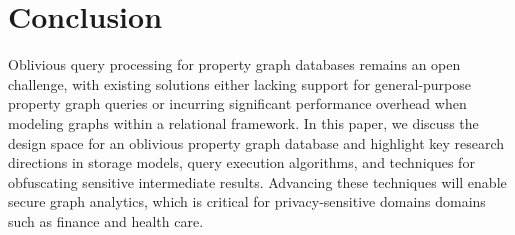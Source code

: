 \vspace{-0.7em}
\section{Conclusion}

Oblivious query processing for property graph databases remains an open challenge, with 
existing solutions either lacking support for general-purpose property graph queries or 
incurring significant performance overhead when modeling graphs within a relational 
framework. In this paper, we discuss the design space for an oblivious property graph 
database and highlight key research directions in storage models, query execution 
algorithms, and techniques for obfuscating sensitive intermediate results. Advancing 
these techniques will enable secure graph analytics, which is critical for privacy-sensitive domains domains such as finance and health care.

